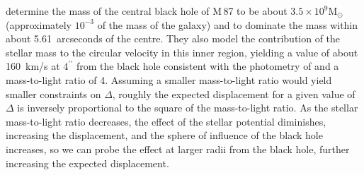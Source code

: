 \documentclass[useAMS,usenatbib]{mn2e}
\newcommand{\msun}{\mathrm{M}_\odot}
\begin{document}

\citet{2013ApJ...770...86W} determine the mass of the central black
hole of M\,87 to be about $3.5 \times 10^{9} \msun$ (approximately
$10^{-3}$ of the mass of the galaxy) and to dominate the mass 
within about 5.61~arcseconds of the centre.  They also model the
contribution of the stellar mass to the circular velocity in this
inner region, yielding a value of about 160~km/s at $4^{\prime\prime}$
from the black hole consistent with the photometry of
\citet{2006ApJS..164..334F} and a mass-to-light ratio of 4. Assuming a
smaller mass-to-light ratio would yield smaller 
constraints 
on $\Delta$, roughly the expected displacement for a given value of
$\Delta$ is inversely proportional to the square of the mass-to-light
ratio.  As the stellar mass-to-light ratio decreases, the effect of
the stellar potential diminishes, increasing the displacement, and the
sphere of influence of the black hole increases, so we can probe the
effect at larger radii from the black hole, further increasing the
expected displacement.
\end{document}
